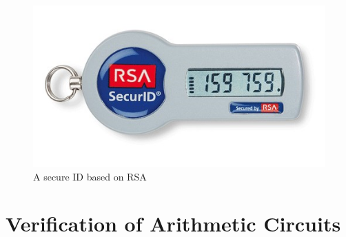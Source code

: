 \documentclass[11pt,twoside, onecolumn]{IEEEtran}
\begin{document}
 \begin{figure}[hbt]
	\begin{center}
	\includegraphics[scale=0.4]{ID.png}
	\end{center}
	\caption{A secure ID based on RSA}
	\label{fig:ID}
\end{figure}
 
\section{Verification of Arithmetic Circuits}
\end{document}

